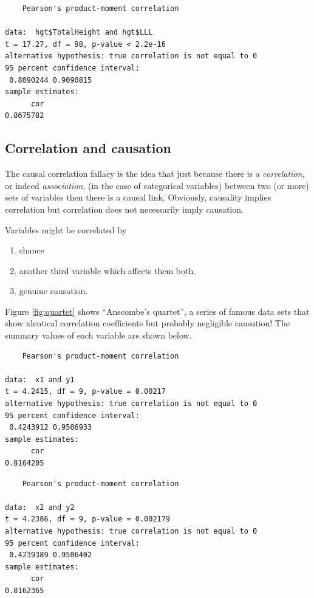 \documentclass[
  oneside]{krantz}
\providecommand{\tightlist}{%
  \setlength{\itemsep}{0pt}\setlength{\parskip}{0pt}}
\begin{document}
\begin{verbatim}
    Pearson's product-moment correlation

data:  hgt$TotalHeight and hgt$LLL
t = 17.27, df = 98, p-value < 2.2e-16
alternative hypothesis: true correlation is not equal to 0
95 percent confidence interval:
 0.8090244 0.9090815
sample estimates:
      cor 
0.8675782 
\end{verbatim}

\hypertarget{correlation-and-causation}{%
\subsection{Correlation and causation}\label{correlation-and-causation}}

The causal correlation fallacy is the idea that just because there is a \emph{correlation}, or indeed \emph{association}, (in the case of categorical variables) between two (or more) sets of variables then there is a causal link. Obviously, causality implies correlation but correlation does not necessarily imply causation.

Variables might be correlated by

\begin{enumerate}
\def\labelenumi{\alph{enumi})}
\tightlist
\item
  chance
\item
  another third variable which affects them both.
\item
  genuine causation.
\end{enumerate}

Figure \ref{fig:quartet} shows ``Anscombe's quartet'', a series of famous data sets that show identical correlation coefficients but probably negligible causation! The summary values of each variable are shown below.

\begin{verbatim}
    Pearson's product-moment correlation

data:  x1 and y1
t = 4.2415, df = 9, p-value = 0.00217
alternative hypothesis: true correlation is not equal to 0
95 percent confidence interval:
 0.4243912 0.9506933
sample estimates:
      cor 
0.8164205 
\end{verbatim}

\begin{verbatim}
    Pearson's product-moment correlation

data:  x2 and y2
t = 4.2386, df = 9, p-value = 0.002179
alternative hypothesis: true correlation is not equal to 0
95 percent confidence interval:
 0.4239389 0.9506402
sample estimates:
      cor 
0.8162365 
\end{verbatim}
\end{document}
